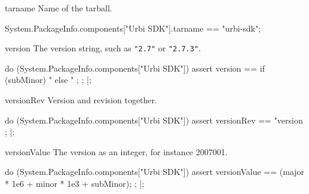 \begin{urbiscriptapi}
\item[tarname] Name of the tarball.
\begin{urbiassert}
System.PackageInfo.components["Urbi SDK"].tarname
  == "urbi-sdk";
\end{urbiassert}


\item[version] The version string, such as \lstinline|"2.7"| or
  \lstinline|"2.7.3"|.
\begin{urbiscript}
do (System.PackageInfo.components["Urbi SDK"])
{
  assert
  {
    version ==
      {
        if (subMinor)
          "%
        else
          "%
      };
  };
}|;
\end{urbiscript}


\item[versionRev] Version and revision together.
\begin{urbiscript}
do (System.PackageInfo.components["Urbi SDK"])
{
  assert
  {
    versionRev
    == "version %
  };
}|;
\end{urbiscript}


\item[versionValue] The version as an integer, for instance 2007001.
\begin{urbiscript}
do (System.PackageInfo.components["Urbi SDK"])
{
  assert
  {
    versionValue == (major * 1e6 + minor * 1e3 + subMinor);
  };
}|;
\end{urbiscript}
\end{urbiscriptapi}

